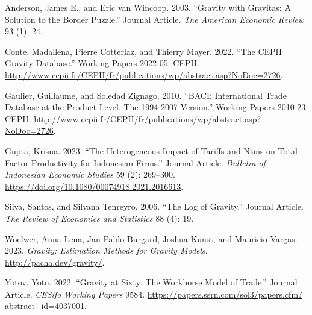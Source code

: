 \documentclass[
  a4paper,
  DIV=11,
  numbers=noendperiod]{scrreprt}
\newlength{\cslhangindent}
\newlength{\cslentryspacingunit} %
\newenvironment{CSLReferences}[2] %
 {%
  \setlength{\parindent}{0pt}
  \ifodd #1
  \let\oldpar\par
  \def\par{\hangindent=\cslhangindent\oldpar}
  \fi
  \setlength{\parskip}{#2\cslentryspacingunit}
 }%
 {}
\begin{document}
\hypertarget{refs}{}
\begin{CSLReferences}{1}{0}
\leavevmode{}%
Anderson, James E., and Eric van Wincoop. 2003. {``Gravity with
Gravitas: A Solution to the Border Puzzle.''} Journal Article. \emph{The
American Economic Review} 93 (1): 24.

\leavevmode{}%
Conte, Madallena, Pierre Cotterlaz, and Thierry Mayer. 2022. {``The
CEPII Gravity Database.''} Working Papers 2022-05. CEPII.
\url{http://www.cepii.fr/CEPII/fr/publications/wp/abstract.asp?NoDoc=2726}.

\leavevmode{}%
Gaulier, Guillaume, and Soledad Zignago. 2010. {``BACI: International
Trade Database at the Product-Level. The 1994-2007 Version.''} Working
Papers 2010-23. CEPII.
\url{http://www.cepii.fr/CEPII/fr/publications/wp/abstract.asp?NoDoc=2726}.

\leavevmode{}%
Gupta, Krisna. 2023. {``The Heterogeneous Impact of Tariffs and Ntms on
Total Factor Productivity for Indonesian Firms.''} Journal Article.
\emph{Bulletin of Indonesian Economic Studies} 59 (2): 269--300.
\url{https://doi.org/10.1080/00074918.2021.2016613}.

\leavevmode{}%
Silva, Santos, and Silvana Tenreyro. 2006. {``The Log of Gravity.''}
Journal Article. \emph{The Review of Economics and Statistics} 88 (4):
19.

\leavevmode{}%
Woelwer, Anna-Lena, Jan Pablo Burgard, Joshua Kunst, and Mauricio
Vargas. 2023. \emph{Gravity: Estimation Methods for Gravity Models}.
\url{http://pacha.dev/gravity/}.

\leavevmode{}%
Yotov, Yoto. 2022. {``Gravity at Sixty: The Workhorse Model of Trade.''}
Journal Article. \emph{CESifo Working Papers} 9584.
\url{https://papers.ssrn.com/sol3/papers.cfm?abstract_id=4037001}.

\end{CSLReferences}
\end{document}
